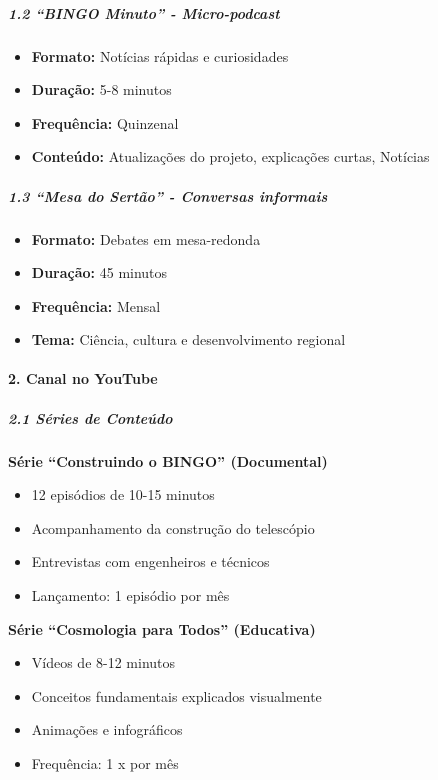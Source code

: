 \subparagraph{1.2 ``BINGO Minuto'' - Micro-podcast}

\begin{itemize}
\item \textbf{Formato:} Notícias rápidas e curiosidades
\item \textbf{Duração:} 5-8 minutos
\item \textbf{Frequência:} Quinzenal
\item \textbf{Conteúdo:} Atualizações do projeto, explicações curtas, Notícias
\end{itemize}

\subparagraph{1.3 ``Mesa do Sertão'' - Conversas informais}

\begin{itemize}
\item \textbf{Formato:} Debates em mesa-redonda
\item \textbf{Duração:} 45 minutos
\item \textbf{Frequência:} Mensal
\item \textbf{Tema:} Ciência, cultura e desenvolvimento regional
\end{itemize}

\paragraph{2. Canal no YouTube}

\subparagraph{2.1 Séries de Conteúdo}

\textbf{Série ``Construindo o BINGO'' (Documental)}

\begin{itemize}
\item 12 episódios de 10-15 minutos
\item Acompanhamento da construção do telescópio
\item Entrevistas com engenheiros e técnicos
\item Lançamento: 1 episódio por mês
\end{itemize}

\textbf{Série ``Cosmologia para Todos'' (Educativa)}

\begin{itemize}
\item Vídeos de 8-12 minutos
\item Conceitos fundamentais explicados visualmente
\item Animações e infográficos
\item Frequência: 1 x por mês
\end{itemize}

